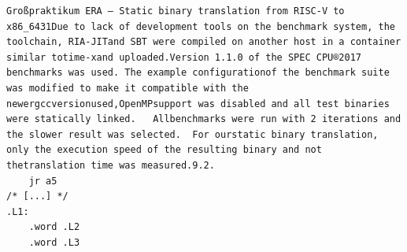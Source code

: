 \begin{frame}[fragile]
\begin{columns}[c]
\begin{lstlisting}[language=rv64, escapechar=!]
Großpraktikum ERA – Static binary translation from RISC-V to x86_6431Due to lack of development tools on the benchmark system, the toolchain, RIA-JITand SBT were compiled on another host in a container similar totime-xand uploaded.Version 1.1.0 of the SPEC CPU®2017 benchmarks was used. The example configurationof the benchmark suite was modified to make it compatible with the newergccversionused,OpenMPsupport was disabled and all test binaries were statically linked.   Allbenchmarks were run with 2 iterations and the slower result was selected.  For ourstatic binary translation, only the execution speed of the resulting binary and not thetranslation time was measured.9.2. 
    jr a5
/* [...] */
.L1:
    .word .L2
    .word .L3
        \end{lstlisting}
    \end{columns}
\end{frame}
\clearpage


